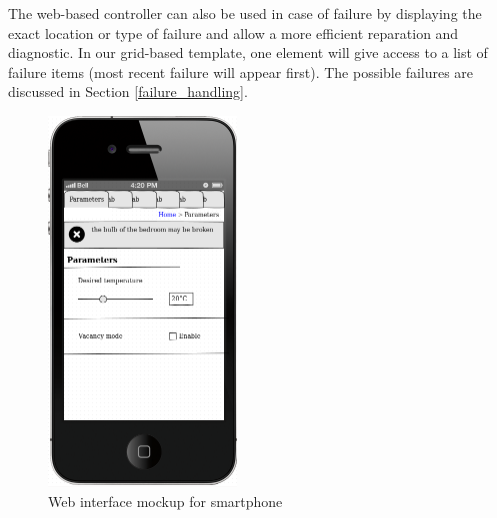 \documentclass{acm_proc_article-sp}
\begin{document}
The web-based controller can also be used in case of failure by displaying the exact location or type of failure and allow a more efficient reparation and diagnostic.
In our grid-based template, one element will give access to a list of failure items (most recent failure will appear first).
The possible failures are discussed in Section \ref{failure_handling}.
				\begin{figure}[htb]
  				\begin{center}
    				\includegraphics[width=5cm]{mockup}
    				\caption{Web interface mockup for smartphone\label{mockup}}
  				\end{center}
				\end{figure}
\end{document}
